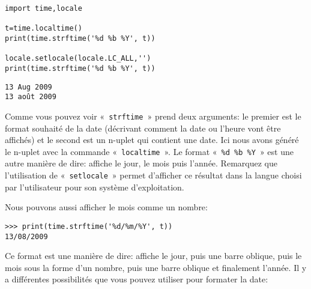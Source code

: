 \begin{Verbatim}[frame=single,rulecolor=\color{gray},label=code]
import time,locale

t=time.localtime()
print(time.strftime('%d %b %Y', t))

locale.setlocale(locale.LC_ALL,'')
print(time.strftime('%d %b %Y', t))
\end{Verbatim}


\begin{Verbatim}[frame=single,rulecolor=\color{gray},label=résultat]
13 Aug 2009
13 août 2009
\end{Verbatim}

Comme vous pouvez voir «~\texttt{strftime}~» prend deux arguments: le premier est le format souhaité de la date (décrivant comment la date ou l'heure vont être affichés) et le second est un n-uplet qui contient une date. Ici nous avons généré le n-uplet avec la commande «~\texttt{localtime}~». Le format «~\texttt{\%d \%b \%Y}~» est une autre manière de dire: affiche le jour, le mois puis l'année. Remarquez que l'utilisation de «~\texttt{setlocale}~» permet d'afficher ce résultat dans la langue choisi par l'utilisateur pour son système d'exploitation.

Nous pouvons aussi afficher le mois comme un nombre:
\begin{Verbatim}[frame=single,rulecolor=\color{gray}]
>>> print(time.strftime('%d/%m/%Y', t))
13/08/2009
\end{Verbatim}

Ce format est une manière de dire: affiche le jour, puis une barre oblique, puis le mois sous la forme d'un nombre, puis une barre oblique et finalement l'année.
Il y a différentes possibilités que vous pouvez utiliser pour formater la date:

